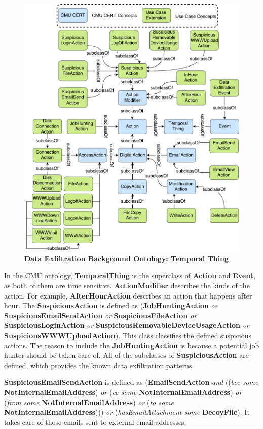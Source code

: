 \begin{figure}[!htbp]
	\centering
    \includegraphics[width=5in]{img/5-dxott.pdf}
    \caption{\textbf{Data Exfiltration Background Ontology: Temporal Thing}}
    \label{fig:tt}
\end{figure}

In the CMU ontology, \textbf{TemporalThing} is the superclass of \textbf{Action} and 
\textbf{Event}, as both of them are time sensitive. 
\textbf{ActionModifier} describes the kinds of the action. 
For example, \textbf{AfterHourAction} describes an action that happens after hour. 
The \textbf{SuspiciousAction} is defined as (\textbf{JobHuntingAction} \textit{or} \textbf{SuspiciousEmailSendAction} \textit{or} \textbf{SuspiciousFileAction} \textit{or} \textbf{SuspiciousLoginAction} \textit{or} \textbf{SuspiciousRemovableDeviceUsageAction} \textit{or} \textbf{SuspiciousWWWUploadAction}). 
This class classifies the defined suspicious actions. 
The reason to include the \textbf{JobHuntingAction} is because a potential job hunter should be taken care of. 
All of the subclasses of \textbf{SuspiciousAction} are defined, which provides the known data exfiltration patterns. 

\textbf{SuspiciousEmailSendAction} is defined as (\textbf{EmailSendAction} \textit{and} ((\textit{bcc some} \textbf{NotInternalEmailAddress}) \textit{or} (\textit{cc some} \textbf{NotInternalEmailAddress}) \textit{or} (\textit{from some} \textbf{NotInternalEmailAddress}) \textit{or} (\textit{to some} \textbf{NotInternalEmailAddress}))) \textit{or} (\textit{hasEmailAttachment some} \textbf{DecoyFile}).
It takes care of those emails sent to external email addresses. 

